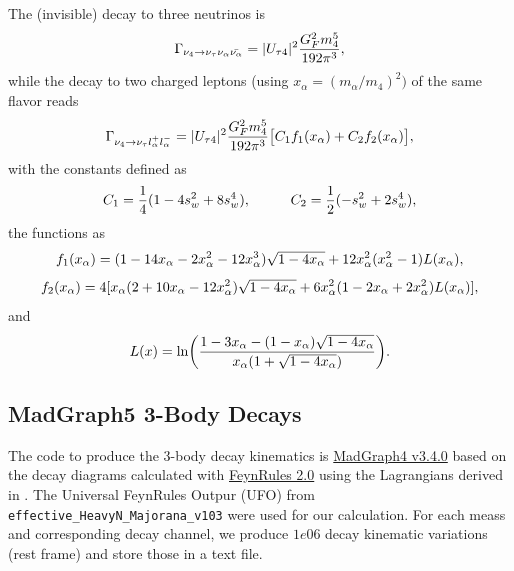 The (invisible) decay to three neutrinos is
\begin{equation}
    \Gamma_{\nu_4 \rightarrow \nu_\tau \nu_\alpha \bar{\nu_\alpha}} = |U_{\tau4}|^2 \frac{G_F^2 m_4^5}{192\pi^3},
    \labeq{gamma_nu_nu_nu}
\end{equation}
while the decay to two charged leptons (using $x_\alpha = (m_\alpha/m_4)^2)$ of the same flavor reads
\begin{equation}
    \Gamma_{\nu_4 \rightarrow \nu_\tau l_\alpha^+ l_\alpha^-} = |U_{\tau4}|^2 \frac{G_F^2 m_4^5}{192\pi^3} \big[ C_1 f_1(x_\alpha) + C_2 f_2(x_\alpha) \big],
    \labeq{gamma_nu_ll_full}
\end{equation}
with the constants defined as
\begin{equation}
    C_1 = \frac{1}{4}(1-4s_w^2+8s_w^4) , \hspace{1cm} C_2 = \frac{1}{2}(-s_w^2+2s_w^4),
    \labeq{gamma_nu_ll_c1_c2}
\end{equation} 
the functions as
\begin{equation}
    f_1(x_\alpha) = (1-14x_\alpha-2x_\alpha^2-12x_\alpha^3)\sqrt{1-4x_\alpha}+12x_\alpha^2(x_\alpha^2-1)L(x_\alpha),
    \labeq{gamma_nu_ll_f1}
\end{equation}
\begin{equation}
    f_2(x_\alpha) = 4[x_\alpha(2+10x_\alpha-12x_\alpha^2)\sqrt{1-4x_\alpha}+6x_\alpha^2(1-2x_\alpha+2x_\alpha^2)L(x_\alpha)],
    \labeq{gamma_nu_ll_f2}
\end{equation}
and
\begin{equation}
    L(x) = \ln \biggl( \frac{ 1-3x_\alpha-(1-x_\alpha)\sqrt{1-4x_\alpha} }{ x_\alpha(1+\sqrt{1-4x_\alpha}) } \biggr).
    \labeq{gamma_nu_ll_l}
\end{equation}


\subsection{MadGraph5 3-Body Decays} 

The code to produce the 3-body decay kinematics is \href{https://launchpad.net/mg5amcnlo/3.0/3.3.x}{MadGraph4 v3.4.0} based on the decay diagrams calculated with \href{http://feynrules.irmp.ucl.ac.be/#FeynRules2.0}{FeynRules 2.0} using the Lagrangians derived in . The Universal FeynRules Outpur (UFO) from \texttt{effective\_HeavyN\_Majorana\_v103} were used for our calculation. For each meass and corresponding decay channel, we produce $1e06$ decay kinematic variations (rest frame) and store those in a text file. 


